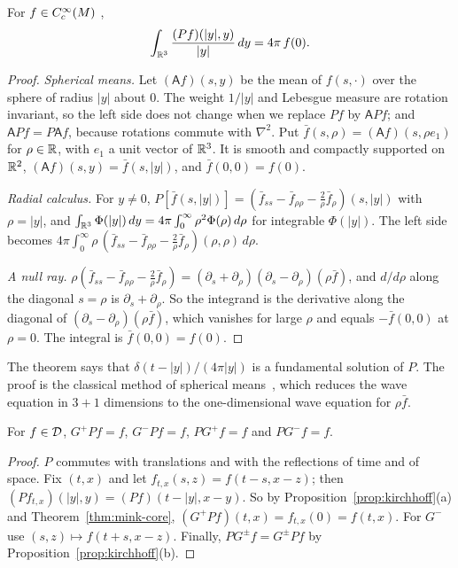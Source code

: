 \begin{theorem}\label{thm:mink-core}
For  $f\in C_c^\infty(M)$ ,
\[
\int_{\mathbb R^3}\frac{(Pf)(|y|,y)}{|y|}\,dy=4\pi\,f(0).
\]
\end{theorem}
\begin{proof}
\emph{Spherical means.} Let $(\mathsf Af)(s,y)$ be the mean of $f(s,\cdot)$ over the sphere of
radius $|y|$ about $0$. The weight $1/|y|$ and Lebesgue measure are rotation invariant, so the left
side does not change when we replace $Pf$ by $\mathsf APf$; and $\mathsf APf=P\mathsf Af$, because
rotations commute with $\nabla^2$. Put $\bar f(s,\rho)=(\mathsf Af)(s,\rho e_1)$ for $\rho\in\mathbb R$, with
$e_1$ a unit vector of $\mathbb R^3$. It is smooth and compactly supported on $\mathbb R^2$, $(\mathsf
Af)(s,y)=\bar f(s,|y|)$, and $\bar f(0,0)=f(0)$.

\emph{Radial calculus.} For $y\neq0$, $P[\bar f(s,|y|)]=(\bar f_{ss}-\bar f_{\rho\rho}-\tfrac2\rho
\bar f_\rho)(s,|y|)$ with $\rho=|y|$, and $\int_{\mathbb R^3}\Phi(|y|)\,dy=4\pi\int_0^\infty\rho^2\Phi(\rho)\,d\rho$
for integrable $\Phi(|y|)$. The left side becomes
$4\pi\int_0^\infty\rho\,(\bar f_{ss}-\bar f_{\rho\rho}-\tfrac2\rho\bar f_\rho)(\rho,\rho)\,d\rho$.

\emph{A null ray.} $\rho(\bar f_{ss}-\bar f_{\rho\rho}-\tfrac2\rho\bar f_\rho)=(\partial_s+
\partial_\rho)(\partial_s-\partial_\rho)(\rho\bar f)$, and $d/d\rho$ along the diagonal $s=\rho$ is
$\partial_s+\partial_\rho$. So the integrand is the derivative along the diagonal of
$(\partial_s-\partial_\rho)(\rho\bar f)$, which vanishes for large $\rho$ and equals $-\bar f(0,0)$ at
$\rho=0$. The integral is $\bar f(0,0)=f(0)$.
\end{proof}

\begin{remark}\label{rem:spherical-means}
The theorem says that $\delta(t-|y|)/(4\pi|y|)$ is a fundamental solution of $P$. The proof is the
classical method of spherical means~\cite[\S2.4.1]{evans}, which reduces the wave equation in $3+1$
dimensions to the one-dimensional wave equation for $\rho\bar f$.
\end{remark}

\begin{corollary}\label{cor:mink-green}
For $f\in\mathcal D$,  $G^+Pf=f$, $G^-Pf=f$, $PG^+f=f$ and $PG^-f=f$.
\end{corollary}
\begin{proof}
$P$ commutes with translations and with the reflections of time and of space. Fix $(t,x)$ and let
$f_{t,x}(s,z)=f(t-s,x-z)$; then $(Pf_{t,x})(|y|,y)=(Pf)(t-|y|,x-y)$. So by
Proposition~\ref{prop:kirchhoff}(a) and Theorem~\ref{thm:mink-core},
$(G^+Pf)(t,x)=f_{t,x}(0)=f(t,x)$. For $G^-$ use $(s,z)\mapsto f(t+s,x-z)$. Finally,
$PG^\pm f=G^\pm Pf$ by Proposition~\ref{prop:kirchhoff}(b).
\end{proof}

